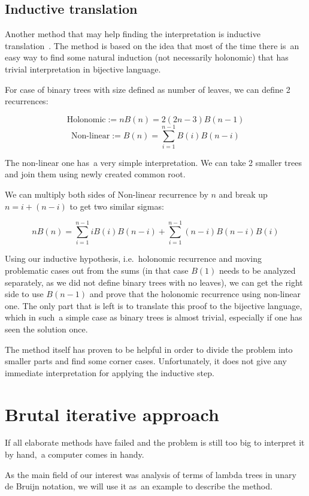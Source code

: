 \documentclass[final]{article}
\theoremstyle{definition}
\theoremstyle{definition}
\theoremstyle{remark}
\begin{document}
\subsection{Inductive translation}%
\label{sub:inductive_translation}

Another method that may help finding the interpretation is inductive translation~\cite{doron}. The method is based on the idea that most of the time there is~an easy way to find some natural induction (not necessarily holonomic) that has trivial interpretation in bijective language.

For case of binary trees with size defined as number of leaves, we can define 2 recurrences:

\[\text{Holonomic} := nB(n) = 2 (2n - 3)B(n - 1)\]
\[\text{Non-linear} := B(n) = \sum_{i=1}^{n - 1} B(i) B(n - i)\]

The non-linear one has~a very simple interpretation. We can take 2 smaller trees and join them using newly created common root.

We can multiply both sides of Non-linear recurrence by \(n\) and break up \(n = i + (n - i)\) to get two similar sigmas:

\[n B(n) = \sum_{i=1}^{n - 1} i B(i) B(n - i) + \sum_{i=1}^{n - 1} (n - i) B(n - i) B(i)\]

Using our inductive hypothesis, i.e.~holonomic recurrence and moving problematic cases out from the sums (in that case \(B(1)\) needs to be analyzed separately, as we did not define binary trees with no leaves), we can get the right side to use \(B(n - 1)\) and prove that the holonomic recurrence using non-linear one. The only part that is left is to translate this proof to the bijective language, which in such~a simple case as binary trees is almost trivial, especially if one has seen the solution once.

The method itself has proven to be helpful in order to divide the problem into smaller parts and find some corner cases. Unfortunately, it does not give any immediate interpretation for applying the inductive step.

\section{Brutal iterative approach}%
\label{sec:brutal_iterative_approach}

If all elaborate methods have failed and the problem is still too big to interpret it by hand,~a computer comes in handy.

As the main field of our interest was analysis of terms of lambda trees in unary de Bruijn notation, we will use it as~an example to describe the method.
\end{document}
